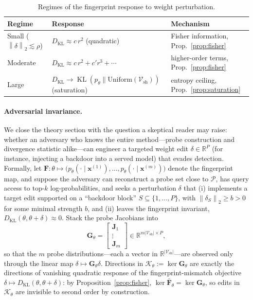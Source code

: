 \documentclass[11pt]{article}
\newcommand{\R}{\mathbb{R}}
\newcommand{\Vsh}{\mathcal{V}_{\mathrm{sh}}}
\newcommand{\norm}[1]{\left\lVert #1 \right\rVert}
\newcommand{\KL}{\operatorname{KL}}
\theoremstyle{definition}
\begin{document}
\begin{table}[t]
\centering
\small
\caption{Regimes of the fingerprint response to weight perturbation.}
\label{tab:regimes}
\begin{tabular}{lll}
\toprule
Regime & Response & Mechanism \\
\midrule
Small ($\norm{\delta}_2 \lesssim \rho$) & $D_{\mathrm{KL}} \approx c\, r^2$ (quadratic) & Fisher information, Prop.~\ref{prop:fisher} \\
Moderate & $D_{\mathrm{KL}} \approx c\, r^2 + c' r^3 + \cdots$ & higher-order terms, Prop.~\ref{prop:fisher} \\
Large & $D_{\mathrm{KL}} \to \KL(p_\theta \| \mathrm{Uniform}(\Vsh))$ (saturation) & entropy ceiling, Prop.~\ref{prop:saturation} \\
\bottomrule
\end{tabular}
\end{table}

\paragraph{Adversarial invariance.}
We close the theory section with the question a skeptical reader may raise:
whether an adversary who knows the entire method---probe construction and
divergence statistic alike---can engineer a targeted weight edit $\delta \in
\R^P$ (for instance, injecting a backdoor into a served model) that evades
detection. Formally, let
$\bm{F} : \theta \mapsto \big(p_\theta(\cdot \mid \bm{x}^{(1)}), \dots,
p_\theta(\cdot \mid \bm{x}^{(m)})\big)$ denote the fingerprint map, and suppose
the adversary can reconstruct a probe set close to $\mathcal{P}$, has query
access to top-$k$ log-probabilities, and seeks a perturbation $\delta$ that (i)
implements a target edit supported on a ``backdoor block'' $S \subseteq \{1,
\dots, P\}$, with $\norm{\delta_S}_2 \ge b > 0$ for some minimal strength $b$,
and (ii) leaves the fingerprint invariant, $D_{\mathrm{KL}}(\theta,
\theta+\delta) \approx 0$. Stack the probe Jacobians into
\begin{equation}
  \bm{G}_\theta =
  \begin{bmatrix} \bm{J}_1 \\ \vdots \\ \bm{J}_m \end{bmatrix}
  \in \R^{m|\Vsh| \times P},
  \label{eq:gstack}
\end{equation}
so that the $m$ probe distributions---each a vector in $\R^{|\Vsh|}$---are
observed only through the linear map $\delta \mapsto \bm{G}_\theta\delta$.
Directions in $\mathcal{K}_\theta := \ker \bm{G}_\theta$ are exactly the
directions of vanishing quadratic response of the fingerprint-mismatch
objective $\delta \mapsto D_{\mathrm{KL}}(\theta, \theta+\delta)$: by
Proposition~\ref{prop:fisher}, $\ker \bar{\bm{F}}_\theta = \ker \bm{G}_\theta$,
so edits in $\mathcal{K}_\theta$ are invisible to second order by
construction.
\end{document}
